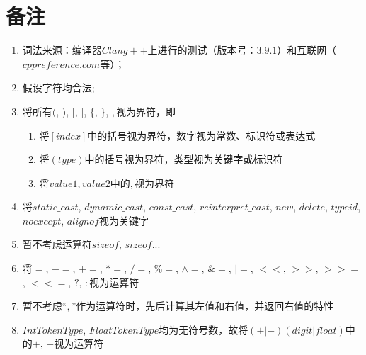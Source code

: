\documentclass[UTF8]{ctexart}
\begin{document}
\section{备注}
\begin{enumerate}
	\item 词法来源：编译器$Clang++$上进行的测试（版本号：$3.9.1$）和互联网（$cppreference.com$等）；
	\item 假设字符均合法;
	\item 将所有$($, $)$, $[$, $]$, $\{$, $\}$, $,$视为界符，即
	      \begin{enumerate}
		      \item 将$[index]$中的括号视为界符，数字视为常数、标识符或表达式
		      \item 将$(type)$中的括号视为界符，类型视为关键字或标识符
		      \item 将${value1, value2}$中的$,$视为界符
	      \end{enumerate}
	\item 将$static\_cast$, $dynamic\_cast$, $const\_cast$, $reinterpret\_cast$, $new$, $delete$, $typeid$, $noexcept$, $alignof$视为关键字
	\item 暂不考虑运算符$sizeof$, $sizeof...$
	\item 将$=$, $-=$, $+=$, $*=$, $/=$, $\%=$, $\wedge=$, $\&=$, $|=$, $<<$, $>>$, $>>=$, $<<=$, $?$, $:$视为运算符
	\item 暂不考虑``$,$''作为运算符时，先后计算其左值和右值，并返回右值的特性
	\item $IntTokenType$, $FloatTokenType$均为无符号数，故将$(+|-)(digit|float)$中的$+$, $-$视为运算符
\end{enumerate}
\end{document}
